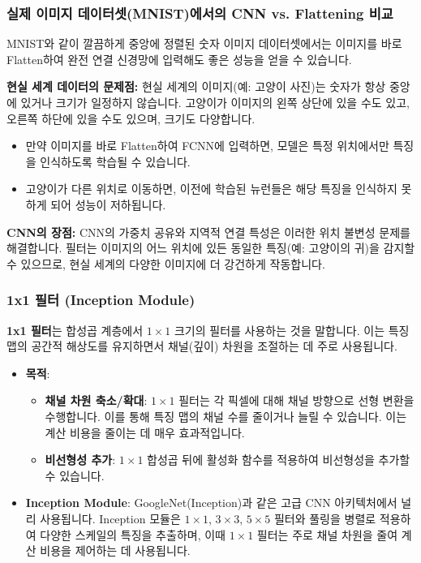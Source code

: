 \documentclass[11pt,a4paper]{article}
\theoremstyle{definition}
\begin{document}
\subsubsection{실제 이미지 데이터셋(MNIST)에서의 CNN vs. Flattening 비교}
MNIST와 같이 깔끔하게 중앙에 정렬된 숫자 이미지 데이터셋에서는 이미지를 바로 Flatten하여 완전 연결 신경망에 입력해도 좋은 성능을 얻을 수 있습니다.

\begin{tcolorbox}[warningbox, title=\textbf{주의}]
\textbf{현실 세계 데이터의 문제점:}
현실 세계의 이미지(예: 고양이 사진)는 숫자가 항상 중앙에 있거나 크기가 일정하지 않습니다. 고양이가 이미지의 왼쪽 상단에 있을 수도 있고, 오른쪽 하단에 있을 수도 있으며, 크기도 다양합니다.
\begin{itemize}
    \item 만약 이미지를 바로 Flatten하여 FCNN에 입력하면, 모델은 특정 위치에서만 특징을 인식하도록 학습될 수 있습니다.
    \item 고양이가 다른 위치로 이동하면, 이전에 학습된 뉴런들은 해당 특징을 인식하지 못하게 되어 성능이 저하됩니다.
\end{itemize}
\textbf{CNN의 장점:}
CNN의 가중치 공유와 지역적 연결 특성은 이러한 위치 불변성 문제를 해결합니다. 필터는 이미지의 어느 위치에 있든 동일한 특징(예: 고양이의 귀)을 감지할 수 있으므로, 현실 세계의 다양한 이미지에 더 강건하게 작동합니다.
\end{tcolorbox}

\subsubsection{1x1 필터 (Inception Module)}
\begin{tcolorbox}[conceptbox, title=\textbf{핵심 개념}]
\textbf{1x1 필터}는 합성곱 계층에서 $1 \times 1$ 크기의 필터를 사용하는 것을 말합니다. 이는 특징 맵의 공간적 해상도를 유지하면서 채널(깊이) 차원을 조절하는 데 주로 사용됩니다.
\end{tcolorbox}
\begin{itemize}
    \item \textbf{목적}:
        \begin{itemize}
            \item \textbf{채널 차원 축소/확대}: $1 \times 1$ 필터는 각 픽셀에 대해 채널 방향으로 선형 변환을 수행합니다. 이를 통해 특징 맵의 채널 수를 줄이거나 늘릴 수 있습니다. 이는 계산 비용을 줄이는 데 매우 효과적입니다.
            \item \textbf{비선형성 추가}: $1 \times 1$ 합성곱 뒤에 활성화 함수를 적용하여 비선형성을 추가할 수 있습니다.
        \end{itemize}
    \item \textbf{Inception Module}: GoogleNet(Inception)과 같은 고급 CNN 아키텍처에서 널리 사용됩니다. Inception 모듈은 $1 \times 1$, $3 \times 3$, $5 \times 5$ 필터와 풀링을 병렬로 적용하여 다양한 스케일의 특징을 추출하며, 이때 $1 \times 1$ 필터는 주로 채널 차원을 줄여 계산 비용을 제어하는 데 사용됩니다.
\end{itemize}
\end{document}
